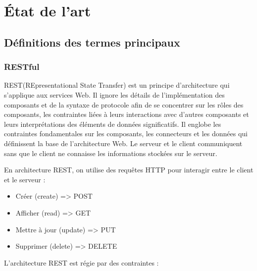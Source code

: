\chapter{État de l'art}

\section{Définitions des termes principaux}

\subsection{RESTful}
REST(REpresentational State Transfer) \cite{Fie00} est un principe d'architecture qui s'applique aux services Web. Il ignore les détails de l'implémentation des composants et de la syntaxe de protocole afin de se concentrer sur les rôles des composants, les contraintes liées à leurs interactions avec d'autres composants et leurs interprétations des éléments de données significatifs. Il englobe les contraintes fondamentales sur les composants, les connecteurs et les données qui définissent la base de l'architecture Web. Le serveur et le client communiquent sans que le client ne connaisse les informations stockées sur le serveur.
\newline

\noindent
En architecture REST, on utilise des requêtes HTTP pour interagir entre le client et le serveur :
\begin{itemize}
    \item Créer (create) => POST
    \item Afficher (read) => GET
    \item Mettre à jour (update) => PUT
    \item Supprimer (delete) => DELETE
    \newline
\end{itemize}

\noindent
L'architecture REST est régie par des contraintes :


